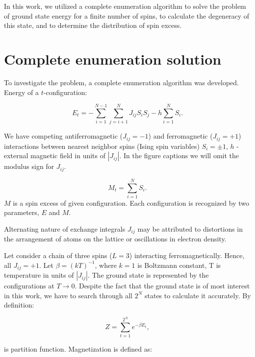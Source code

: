 \documentclass[preprint,12pt]{elsarticle}
\begin{document}
	In this work, we utilized a complete enumeration algorithm \cite{dias2023ground, padalko2021parallel} to solve the problem of ground state energy for a finite number of spins, to calculate the degeneracy of this state, and to determine the distribution of spin excess.
	
	\section{Complete enumeration solution}
	
	To investigate the problem, a complete enumeration algorithm was developed. Energy of a $t$-configuration:
	
	\begin{equation}
		E_t = -\sum^{N - 1}_{i=1}\sum^N_{j = i + 1} J_{ij} S_i S_j - h \sum^N_{i=1} S_i.
		\label{eq:ising_energy}
	\end{equation}
	
	We have competing antiferromagnetic ($J_{ij} = -1$) and ferromagnetic ($J_{ij} = +1$) interactions between nearest neighbor spins (Ising spin variables) $S_i = \pm1$, $h$ - external magnetic field in units of $|J_{ij}|$. In the figure captions we will omit the modulus sign for $J_{ij}$.
	
	\begin{equation}
		M_t = \sum^N_{i=1} S_i.
		\label{eq:spin_excess} 
	\end{equation}
	$M$ is a spin excess of given configuration. Each configuration is recognized by two parameters, $E$ and $M$.
	
	
	Alternating nature of exchange integrals $J_{ij}$ may be attributed to distortions in the arrangement of atoms on the lattice or oscillations in electron density.
	
	Let consider a chain of three spins ($L = 3$) interacting ferromagnetically. Hence, all $J_{ij} = +1$. Let $\beta = (kT)^{-1}$, where $k = 1$ is Boltzmann constant, T is temperature in units of $|J_{ij}|$. The ground state is represented by the configurations at  $T \rightarrow 0$. Despite the fact that the ground state is of most interest in this work, we have to search through all $2^N$ states to calculate it accurately. By definition:
	
		\begin{equation}
		Z = \sum_{t = 1}^{2 ^ N} e^{-\beta E_t},
		\label{eq:stat_difinition}
	\end{equation}
	
	\noindent is partition function. Magnetization is defined as: 
	
\end{document}
